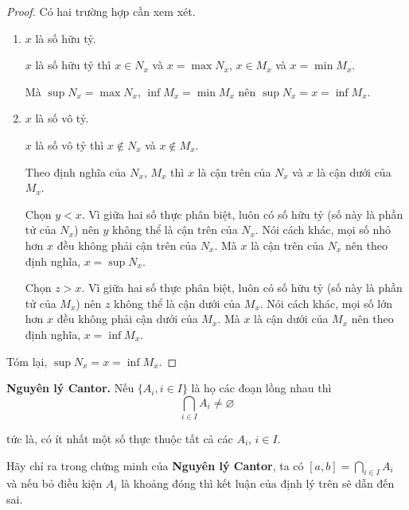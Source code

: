 \documentclass[class=analysis,crop=false]{standalone}
\begin{document}
\begin{proof}
    Có hai trường hợp cần xem xét.
    \begin{enumerate}[label = Trường hợp \arabic*.,itemindent=1.5cm]
        \item $x$ là số hữu tỷ.
              \par $x$ là số hữu tỷ thì $x\in N_{x}$ và $x = \max N_{x}$, $x\in M_{x}$ và $x = \min M_{x}$.
              \par Mà $\sup N_{x} = \max N_{x}$, $\inf M_{x} = \min M_{x}$ nên $\sup N_{x} = x = \inf M_{x}$.
        \item $x$ là số vô tỷ.
              \par $x$ là số vô tỷ thì $x\notin N_{x}$ và $x\notin M_{x}$.
              \par Theo định nghĩa của $N_{x}$, $M_{x}$ thì $x$ là cận trên của $N_{x}$ và $x$ là cận dưới của $M_{x}$.
              \par Chọn $y < x$. Vì giữa hai số thực phân biệt, luôn có số hữu tỷ (số này là phần tử của $N_{x}$) nên $y$ không thể là cận trên của $N_{x}$. Nói cách khác, mọi số nhỏ hơn $x$ đều không phải cận trên của $N_{x}$. Mà $x$ là cận trên của $N_{x}$ nên theo định nghĩa, $x = \sup N_{x}$.
              \par Chọn $z > x$. Vì giữa hai số thực phân biệt, luôn có số hữu tỷ (số này là phần tử của $M_{x}$) nên $z$ không thể là cận dưới của $M_{x}$. Nói cách khác, mọi số lớn hơn $x$ đều không phải cận dưới của $M_{x}$. Mà $x$ là cận dưới của $M_{x}$ nên theo định nghĩa, $x = \inf M_{x}$.
    \end{enumerate}
    \par Tóm lại, $\sup N_{x} = x = \inf M_{x}$.
\end{proof}

\par\textbf{Nguyên lý Cantor.} Nếu $\{ A_{i}, i\in I \}$ là họ các đoạn lồng nhau thì
\[
    \bigcap_{i\in I}A_{i} \ne \varnothing
\]
\par tức là, có ít nhất một số thực thuộc tất cả các $A_{i}$, $i\in I$.

\begin{exercise}
    Hãy chỉ ra trong chứng minh của \textbf{Nguyên lý Cantor}, ta có $[a,b] = \bigcap\limits_{i\in I}A_{i}$ và nếu bỏ điều kiện $A_{i}$ là khoảng đóng thì kết luận của định lý trên sẽ dẫn đến sai.
\end{exercise}
\end{document}
